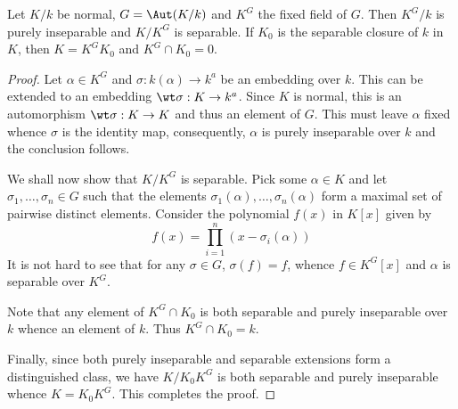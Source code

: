 \begin{lemma}
    Let $K/k$ be normal, $G = \Aut(K/k)$ and $K^G$ the fixed field of $G$. Then $K^G/k$ is purely inseparable and $K/K^G$ is separable. If $K_0$ is the separable closure of $k$ in $K$, then $K = K^GK_0$ and $K^G\cap K_0 = 0$.
\end{lemma}
\begin{proof}
    Let $\alpha\in K^G$ and $\sigma: k(\alpha)\to k^a$ be an embedding over $k$. This can be extended to an embedding $\wt\sigma: K\to k^a$. Since $K$ is normal, this is an automorphism $\wt\sigma: K\to K$ and thus an element of $G$. This must leave $\alpha$ fixed whence $\sigma$ is the identity map, consequently, $\alpha$ is purely inseparable over $k$ and the conclusion follows.


    We shall now show that $K/K^G$ is separable. Pick some $\alpha\in K$ and let $\sigma_1,\ldots,\sigma_n\in G$ such that the elements $\sigma_1(\alpha),\ldots,\sigma_n(\alpha)$ form a maximal set of pairwise distinct elements. Consider the polynomial $f(x)$ in $K[x]$ given by
    \begin{equation*}
        f(x) = \prod_{i = 1}^n(x - \sigma_i(\alpha))
    \end{equation*}
    It is not hard to see that for any $\sigma\in G$, $\sigma(f) = f$, whence $f\in K^G[x]$ and $\alpha$ is separable over $K^G$.

    Note that any element of $K^G\cap K_0$ is both separable and purely inseparable over $k$ whence an element of $k$. Thus $K^G\cap K_0 = k$. 

    Finally, since both purely inseparable and separable extensions form a distinguished class, we have $K/K_0K^G$ is both separable and purely inseparable whence $K = K_0K^G$. This completes the proof.
\end{proof}